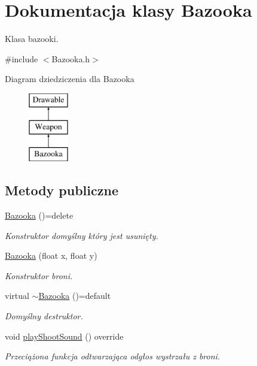 \hypertarget{class_bazooka}{}\section{Dokumentacja klasy Bazooka}
\label{class_bazooka}


Klasa bazooki.  




{\ttfamily \#include $<$Bazooka.\+h$>$}

Diagram dziedziczenia dla Bazooka\begin{figure}[H]
\begin{center}
\leavevmode
\includegraphics[height=3.000000cm]{class_bazooka}
\end{center}
\end{figure}
\subsection*{Metody publiczne}
\begin{DoxyCompactItemize}
\item 
\mbox{\hyperlink{class_bazooka_ab95ef6e55a5d1a7748df7287b562002b}{Bazooka}} ()=delete
\begin{DoxyCompactList}\small\item\em Konstruktor domyślny który jest usunięty. \end{DoxyCompactList}\item 
\mbox{\hyperlink{class_bazooka_aa3a6371f52b0649a6789401b8a11e8bd}{Bazooka}} (float x, float y)
\begin{DoxyCompactList}\small\item\em Konstruktor broni. \end{DoxyCompactList}\item 
virtual \mbox{\hyperlink{class_bazooka_a25ec2ef6a925a3b13947ad877d2ac823}{$\sim$\+Bazooka}} ()=default
\begin{DoxyCompactList}\small\item\em Domyślny destruktor. \end{DoxyCompactList}\item 
void \mbox{\hyperlink{class_bazooka_a2645b8043766ec5045e82d452828acdd}{play\+Shoot\+Sound}} () override
\begin{DoxyCompactList}\small\item\em Przeciążona funkcja odtwarzająca odgłos wystrzału z broni. \end{DoxyCompactList}\end{DoxyCompactItemize}
